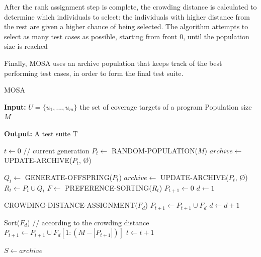 After the rank assignment step is complete, the crowding distance is calculated to determine which individuals to select: the individuals with higher distance from the rest are given a higher chance of being selected. The algorithm attempts to select as many test cases as possible, starting from front 0,  until the population size is reached

Finally, MOSA uses an archive population that keeps track of the best performing test cases, in order to form the final test suite.

\begin{algorithm}
    \caption{MOSA}
    \hspace*{\algorithmicindent} \textbf{Input:} 
    $ U = \{u_1,...,u_m\} $ the set of coverage targets of a program
    Population size $ M $

    \hspace*{\algorithmicindent} \textbf{Output:}
    A test suite T
    
    \begin{algorithmic}[1]
        \Begin
            \State $ t \leftarrow 0 $ // current generation
            \State $ P_t \leftarrow $ RANDOM-POPULATION($ M $) 
            \State $ archive \leftarrow $ UPDATE-ARCHIVE($ P_t $, \O ) 

                \State $ Q_t \leftarrow $  GENERATE-OFFSPRING($ P_t $)
                \State $ archive \leftarrow $ UPDATE-ARCHIVE($ P_t $, \O) 
                \State $ R_t \leftarrow P_t \cup Q_t $
                \State $ F \leftarrow $  PREFERENCE-SORTING($ R_t $)
                \State $ P_{t + 1} \leftarrow 0 $
                \State $ d \leftarrow 1 $

                    CROWDING-DISTANCE-ASSIGNMENT($ F_d $)
                    \State $ P_{t + 1} \leftarrow P_{t + 1} \cup F_d $
                    \State $ d \leftarrow d + 1 $
                \EndWhile

                Sort($ F_d $) // according to the crowding distance
                \State $ P_{t + 1} \leftarrow P_{t + 1} \cup F_d[1: (M - |P_{t + 1}|)] $
                \State $ t \leftarrow t + 1 $
            \EndWhile

            \State $ S \leftarrow archive $
        \End
    \end{algorithmic}
\end{algorithm}


